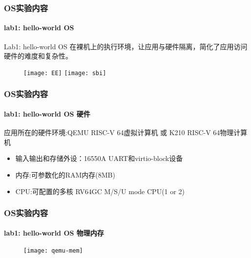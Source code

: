 \begin{frame}
    \frametitle{OS实验内容}
    \framesubtitle{lab1: hello-world OS}
    \begin{block}{Lab1:  hello-world OS}
        在裸机上的执行环境，让应用与硬件隔离，简化了应用访问硬件的难度和复杂性。
    \end{block}
    
    \begin{figure}
        \centering
        \texttt{[image: EE]} %
        \texttt{[image: sbi]}
    \end{figure}
    
\end{frame}
\begin{frame}
    \frametitle{OS实验内容}
    \framesubtitle{lab1: hello-world OS 硬件}
    

    应用所在的硬件环境:QEMU RISC-V 64虚拟计算机 或 K210 RISC-V 64物理计算机
    \begin{itemize}
        \item 输入输出和存储外设：16550A UART和virtio-block设备
        \item 内存:可参数化的RAM内存(8MB)
        \item CPU:可配置的多核 RV64GC M/S/U mode CPU(1 or 2)
    \end{itemize}
\end{frame}
\begin{frame}
    \frametitle{OS实验内容}
    \framesubtitle{lab1: hello-world OS 物理内存}
    
    
    \begin{figure}
    \centering
    \texttt{[image: qemu-mem]} %
\end{figure}
\end{frame}
